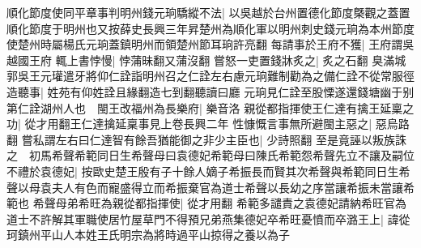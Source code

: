 順化節度使同平章事判明州錢元珦驕縱不法|{
	以吳越於台州置德化節度槩觀之蓋置順化節度于明州也又按薛史長興三年昇楚州為順化軍以明州刺史錢元珦為本州節度使楚州時屬楊氏元珦蓋鎮明州而領楚州節耳珦許亮翻}
每請事於王府不獲|{
	王府謂吳越國王府}
輒上書悖慢|{
	悖蒲昧翻又蒲沒翻}
嘗怒一吏置錢牀炙之|{
	炙之石翻}
臭滿城郭吳王元瓘遣牙將仰仁詮詣明州召之仁詮左右慮元珦難制勸為之備仁詮不從常服徑造聽事|{
	姓苑有仰姓詮且緣翻造七到翻聽讀曰廳}
元珦見仁詮至股慄遂還錢塘幽于别第仁詮湖州人也　閩王改福州為長樂府|{
	樂音洛}
親從都指揮使王仁達有擒王延稟之功|{
	從才用翻王仁達擒延稟事見上卷長興二年}
性慷慨言事無所避閩主惡之|{
	惡烏路翻}
嘗私謂左右曰仁達智有餘吾猶能御之非少主臣也|{
	少詩照翻}
至是竟誣以叛族誅之　初馬希聲希範同日生希聲母曰袁德妃希範母曰陳氏希範怨希聲先立不讓及嗣位不禮於袁德妃|{
	按歐史楚王殷有子十餘人嫡子希振長而賢其次希聲與希範同日生希聲以母袁夫人有色而寵盛得立而希振棄官為道士希聲以長幼之序當讓希振未當讓希範也}
希聲母弟希旺為親從都指揮使|{
	從才用翻}
希範多譴責之袁德妃請納希旺官為道士不許解其軍職使居竹屋草門不得預兄弟燕集德妃卒希旺憂憤而卒潞王上|{
	諱從珂鎮州平山人本姓王氏明宗為將時過平山掠得之養以為子}


